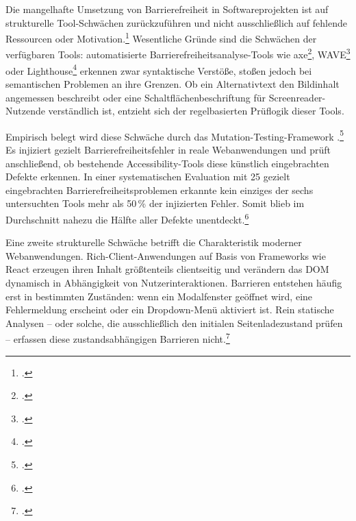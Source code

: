 Die mangelhafte Umsetzung von Barrierefreiheit in Softwareprojekten ist auf strukturelle Tool-Schwächen zurückzuführen und nicht ausschließlich auf fehlende Ressourcen oder Motivation.\footcite[Vgl.][S. 123]{mowar_accessibility_2024} Wesentliche Gründe sind die Schwächen der verfügbaren Tools: automatisierte Barrierefreiheitsanalyse-Tools wie axe\footcite[Vgl.][]{axe}, WAVE\footcite[Vgl.][]{WAVE} oder Lighthouse\footcite[Vgl.][]{Lighthouse} erkennen zwar syntaktische Verstöße, stoßen jedoch bei semantischen Problemen an ihre Grenzen. Ob ein Alternativtext den Bildinhalt angemessen beschreibt oder eine Schaltflächenbeschriftung für Screenreader-Nutzende verständlich ist, entzieht sich der regelbasierten Prüflogik dieser Tools.

Empirisch belegt wird diese Schwäche durch das Mutation-Testing-Framework .\footcite[Vgl.][S. 97]{tafreshipour_ma11y_2024} Es injiziert gezielt Barrierefreiheitsfehler in reale Webanwendungen und prüft anschließend, ob bestehende Accessibility-Tools diese künstlich eingebrachten Defekte erkennen. In einer systematischen Evaluation mit 25 gezielt eingebrachten Barrierefreiheitsproblemen erkannte kein einziges der sechs untersuchten Tools mehr als 50\,\% der injizierten Fehler. Somit blieb im Durchschnitt nahezu die Hälfte aller Defekte unentdeckt.\footcite[Vgl.][S. 100]{tafreshipour_ma11y_2024} 


Eine zweite strukturelle Schwäche betrifft die Charakteristik moderner Webanwendungen. Rich-Client-Anwendungen auf Basis von Frameworks wie React erzeugen ihren Inhalt größtenteils clientseitig und verändern das \ac{DOM} dynamisch in Abhängigkeit von Nutzerinteraktionen. Barrieren entstehen häufig erst in bestimmten Zuständen: wenn ein Modalfenster geöffnet wird, eine Fehlermeldung erscheint oder ein Dropdown-Menü aktiviert ist. Rein statische Analysen -- oder solche, die ausschließlich den initialen Seitenladezustand prüfen -- erfassen diese zustandsabhängigen Barrieren nicht.\footcite[Vgl.][S. 303]{bassi_assessment_2025}

